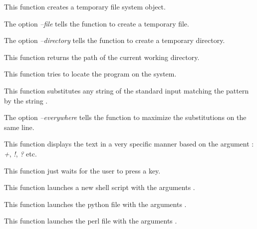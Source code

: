          {
	   This function creates a temporary file system object.

	   The option \textit{--file} tells the function to create a
	   temporary file.

	   The option \textit{--directory} tells the function to create
	   a temporary directory.
	 }

         {
	   This function returns the path of the current working directory.
	 }

         {
	   This function tries to locate the program 
	   on the system.
	 }

         {
	   This function substitutes any string of the standard input
	   matching the pattern  by the string
	   .

	   The option \textit{--everywhere} tells the function to
	   maximize the substitutions on the same line.
	 }

         {
	   This function displays the text  in a
	   very specific manner based on the argument :
	   \textit{+}, \textit{!}, \textit{?} etc.
	 }

         {
	   This function just waits for the user to press a key.
	 }

         {
	   This function launches a new shell script  with
	   the arguments .
	 }

         {
	   This function launches the python file  with
	   the arguments .
	 }

         {
	   This function launches the perl file  with
	   the arguments .
	 }


